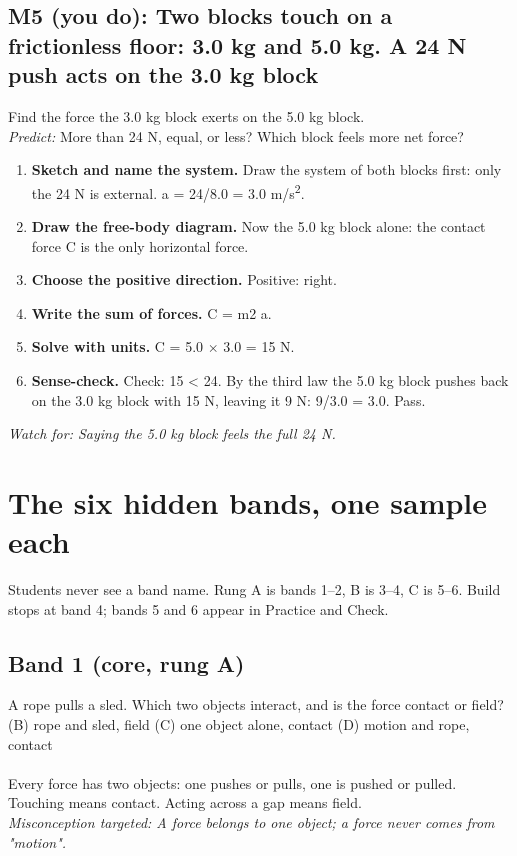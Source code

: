 \documentclass[11pt]{article}
\begin{document}
\subsection*{M5 (you do): Two blocks touch on a frictionless floor: 3.0 kg and 5.0 kg. A 24 N push acts on the 3.0 kg block}
Find the force the 3.0 kg block exerts on the 5.0 kg block.\\ \textit{Predict:} More than 24 N, equal, or less? Which block feels more net force? 
\begin{enumerate}
\item \textbf{Sketch and name the system.} Draw the system of both blocks first: only the 24 N is external. a = 24/8.0 = 3.0 m/s\textsuperscript{2}.
\item \textbf{Draw the free-body diagram.} Now the 5.0 kg block alone: the contact force C is the only horizontal force.
\item \textbf{Choose the positive direction.} Positive: right.
\item \textbf{Write the sum of forces.} C = m2 a.
\item \textbf{Solve with units.} C = 5.0 $\times$ 3.0 = 15 N.
\item \textbf{Sense-check.} Check: 15 < 24. By the third law the 5.0 kg block pushes back on the 3.0 kg block with 15 N, leaving it 9 N: 9/3.0 = 3.0. Pass.
\end{enumerate}
 \quad \textit{Watch for: Saying the 5.0 kg block feels the full 24 N.}\par
\section*{The six hidden bands, one sample each}
Students never see a band name. Rung A is bands 1--2, B is 3--4, C is 5--6. Build stops at band 4; bands 5 and 6 appear in Practice and Check.\par\medskip
\subsection*{Band 1 (core, rung A)}
\noindent A rope pulls a sled. Which two objects interact, and is the force contact or field?\\  \quad (B) rope and sled, field \quad (C) one object alone, contact \quad (D) motion and rope, contact\\ \\ Every force has two objects: one pushes or pulls, one is pushed or pulled. Touching means contact. Acting across a gap means field.\\ \textit{Misconception targeted: A force belongs to one object; a force never comes from "motion".}\par
\end{document}
